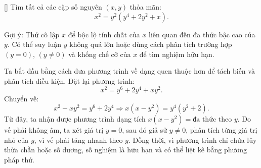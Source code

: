 \documentclass[../04-diophantine-equations.tex]{subfiles}
\begin{document}
\begin{exercise*}\label{example:FRA-2015-TST3-P6}[\textbf{}]
    Tìm tất cả các cặp số nguyên \( (x, y) \) thỏa mãn:
    \[
        x^2 = y^2(y^4 + 2y^2 + x).
    \]
\end{exercise*}

\begin{remark*}
    Gợi ý: Thử cô lập \(x\) để bộc lộ tính chất của \(x\) liên quan đến đa thức bậc cao của \(y\).  
    Có thể suy luận \(y\) không quá lớn hoặc dùng cách phân tích trường hợp \((y = 0)\), \((y \neq 0)\) và khống chế cỡ của \(x\) để tìm nghiệm hữu hạn.
\end{remark*}

\begin{story*}
    Ta bắt đầu bằng cách đưa phương trình về dạng quen thuộc hơn để tách biến và phân tích điều kiện.  
    Đặt lại phương trình:
    \[
        x^2 = y^6 + 2y^4 + xy^2.
    \]
    Chuyển vế:
    \[
        x^2 - xy^2 = y^6 + 2y^4 \Rightarrow x(x - y^2) = y^4(y^2 + 2).
    \]
    Từ đây, ta nhận được phương trình dạng tích \(x(x - y^2) = \text{đa thức theo } y\).  
    Do vế phải không âm, ta xét giá trị \(y = 0\), sau đó giả sử \(y \ne 0\), phân tích từng giá trị nhỏ của \(y\), vì vế phải tăng nhanh theo \(y\).  
    Đồng thời, vì phương trình chỉ chứa lũy thừa chẵn hoặc số dương, số nghiệm là hữu hạn và có thể liệt kê bằng phương pháp thử.
\end{story*}
\end{document}
